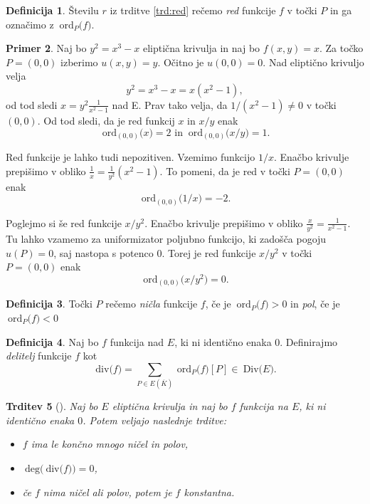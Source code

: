 \documentclass[12pt,a4paper,twoside]{article}
\theoremstyle{definition} %
\newtheorem{definicija}{Definicija}[section]
\newtheorem{primer}[definicija]{Primer}
\theoremstyle{plain} %
\newtheorem{trditev}[definicija]{Trditev}
\numberwithin{equation}{section}  %
\newcommand{\E}[1]{E({#1})}
\newcommand{\DIV}[1]{\ \text{Div(}{#1}\text{)}}
\newcommand{\DEG}[1]{\ \text{deg(}{#1}\text{)}}
\newcommand{\Div}[1]{\ \text{div(}{#1}\text{)}}
\newcommand{\ORDp}[2]{\ \text{ord}_{#2}({#1}\text{)}}
\begin{document}
\begin{definicija}
Številu $r$ iz trditve \ref{trd:red} rečemo \emph{red} funkcije $f$ v točki $P$ in ga označimo z $\ORDp{f}{P}$.
\end{definicija}

\begin{primer}
Naj bo $y^2 = x^3-x$ eliptična krivulja in naj bo $f(x,y) = x$. Za točko $P = (0,0)$ izberimo $u(x,y) = y$. Očitno je $u(0,0) = 0$. Nad eliptično krivuljo velja 
$$y^2 = x^3-x = x(x^2-1),$$ 
od tod sledi $x = y^2\frac{1}{x^2-1}$ nad E.
Prav tako velja, da $1/(x^2-1) \neq 0$ v točki $(0,0)$. Od tod sledi, da je red funkcij $x$ in $x/y$ enak
$$\ORDp{x}{(0,0)} = 2\text{ in }  \ORDp{x/y}{(0,0)}= 1.$$

Red funkcije je lahko tudi nepozitiven. Vzemimo funkcijo $1/x$. Enačbo krivulje prepišimo v obliko $\frac{1}{x} = \frac{1}{y^2}(x^2-1)$. To pomeni, da je red v točki $P=(0,0)$ enak
$$\ORDp{1/x}{(0,0)} = -2.$$

Poglejmo si še red funkcije $x/y^2$. Enačbo krivulje prepišimo v obliko $\frac{x}{y^2} = \frac{1}{x^2-1}$. Tu lahko vzamemo za uniformizator poljubno funkcijo, ki zadošča pogoju $u(P) = 0$, saj nastopa s potenco $0$. Torej je red funkcije $x/y^2$ v točki $P=(0,0)$ enak
$$\ORDp{x/y^2}{(0,0)} = 0.$$
\end{primer}

\begin{definicija}
Točki $P$ rečemo \emph{ničla} funkcije $f$, če je $\ORDp{f}{P} > 0$ in \emph{pol}, če je $\ORDp{f}{P} < 0$
\end{definicija}

\begin{definicija}
Naj bo $f$ funkcija nad $E$, ki ni identično enaka $0$. Definirajmo \emph{delitelj} funkcije $f$ kot
$$\Div{f} = \sum_{P\in \E{\overline{K}}} \ORDp{f}{P}[P] \in \DIV{E}.$$
\end{definicija}


\begin{trditev}[]
\label{trditev 11.1}
Naj bo $E$ eliptična krivulja in naj bo $f$ funkcija na $E$, ki ni identično enaka $0$. Potem veljajo naslednje trditve:
\begin{itemize}

\item $f$ ima le končno mnogo ničel in polov,
\item $\DEG{\Div{f}}=0$,
\item če $f$ nima ničel ali polov, potem je $f$ konstantna.
\end{itemize}


\end{trditev}
\end{document}

